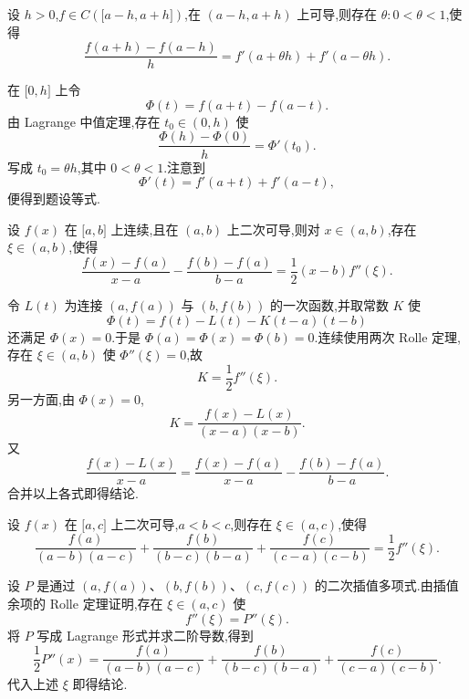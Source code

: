 \begin{example}
    设 $h>0$,$f\in C(\lbrack a-h,a+h\rbrack)$,在 $(a-h,a+h)$ 上可导,则存在 $\theta:0<\theta<1$,使得
    \[
        \dfrac{f(a+h)-f(a-h)}{h}
        =f'(a+\theta h)+f'(a-\theta h).
    \]
\end{example}
\exampleblank

\begin{solution}
    在 $\lbrack0,h\rbrack$ 上令
    \[
        \Phi(t)=f(a+t)-f(a-t).
    \]
    由 Lagrange 中值定理,存在 $t_0\in(0,h)$ 使
    \[
        \dfrac{\Phi(h)-\Phi(0)}{h}=\Phi'(t_0).
    \]
    写成 $t_0=\theta h$,其中 $0<\theta<1$.注意到
    \[
        \Phi'(t)=f'(a+t)+f'(a-t),
    \]
    便得到题设等式.
\end{solution}

\begin{example}
    设 $f(x)$ 在 $\lbrack a,b\rbrack$ 上连续,且在 $(a,b)$ 上二次可导,则对 $x\in(a,b)$,存在 $\xi\in(a,b)$,使得
    \[
        \dfrac{f(x)-f(a)}{x-a}
        -\dfrac{f(b)-f(a)}{b-a}
        =\dfrac{1}{2}(x-b)f''(\xi).
    \]
\end{example}
\exampleblank

\begin{solution}
    令 $L(t)$ 为连接 $(a,f(a))$ 与 $(b,f(b))$ 的一次函数,并取常数 $K$ 使
    \[
        \Phi(t)=f(t)-L(t)-K(t-a)(t-b)
    \]
    还满足 $\Phi(x)=0$.于是 $\Phi(a)=\Phi(x)=\Phi(b)=0$.连续使用两次 Rolle 定理,存在 $\xi\in(a,b)$ 使 $\Phi''(\xi)=0$,故
    \[
        K=\dfrac{1}{2}f''(\xi).
    \]
    另一方面,由 $\Phi(x)=0$,
    \[
        K=\dfrac{f(x)-L(x)}{(x-a)(x-b)}.
    \]
    又
    \[
        \dfrac{f(x)-L(x)}{x-a}
        =\dfrac{f(x)-f(a)}{x-a}
        -\dfrac{f(b)-f(a)}{b-a}.
    \]
    合并以上各式即得结论.
\end{solution}

\begin{example}
    设 $f(x)$ 在 $\lbrack a,c\rbrack$ 上二次可导,$a<b<c$,则存在 $\xi\in(a,c)$,使得
    \[
        \dfrac{f(a)}{(a-b)(a-c)}
        +\dfrac{f(b)}{(b-c)(b-a)}
        +\dfrac{f(c)}{(c-a)(c-b)}
        =\dfrac{1}{2}f''(\xi).
    \]
\end{example}
\exampleblank

\begin{solution}
    设 $P$ 是通过 $(a,f(a))$、$(b,f(b))$、$(c,f(c))$ 的二次插值多项式.由插值余项的 Rolle 定理证明,存在 $\xi\in(a,c)$ 使
    \[
        f''(\xi)=P''(\xi).
    \]
    将 $P$ 写成 Lagrange 形式并求二阶导数,得到
    \[
        \dfrac{1}{2}P''(x)
        =\dfrac{f(a)}{(a-b)(a-c)}
        +\dfrac{f(b)}{(b-c)(b-a)}
        +\dfrac{f(c)}{(c-a)(c-b)}.
    \]
    代入上述 $\xi$ 即得结论.
\end{solution}

